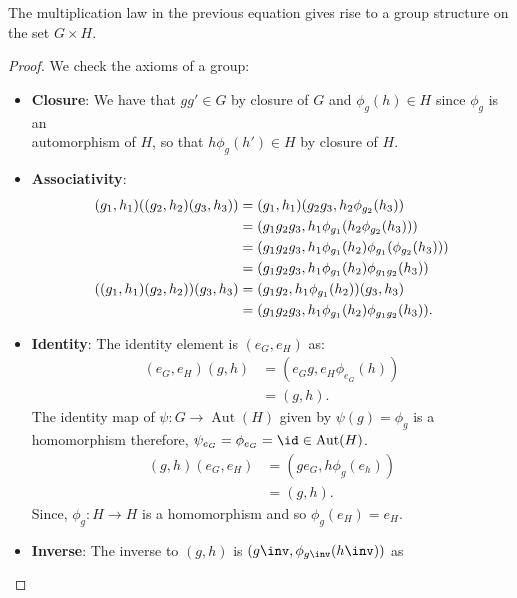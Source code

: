 \documentclass[12pt, a4paper]{article}
\DeclareMathOperator{\aut}{Aut}
\begin{document}
\begin{theorem}
    The multiplication law in the previous equation gives rise to a group structure on the set \(G \times H\).
\end{theorem}

\begin{proof}
    We check the axioms of a group:
    \begin{itemize}
        \item \textbf{Closure}: We have that \(gg' \in G\) by closure of \(G\) and \(\phi_g(h) \in H\) since \(\phi_g\) is an \\ automorphism of \(H\), so that \(h\phi_g(h') \in H\) by closure of \(H\).
        \item \textbf{Associativity}: 
        \[\begin{aligned}
            (g_1,h_1)((g_2,h_2)(g_3,h_3)) &= (g_1,h_1)(g_2g_3,h_2\phi_{g_2}(h_3)) \\
            &= (g_1g_2g_3, h_1\phi_{g_1}(h_2\phi_{g_2}(h_3))) \\
            &= (g_1g_2g_3, h_1\phi_{g_1}(h_2)\phi_{g_1}(\phi_{g_2}(h_3))) \\
            &= (g_1g_2g_3, h_1\phi_{g_1}(h_2)\phi_{g_1g_2}(h_3)) \\
            \vspace{5em}
            ((g_1,h_1)(g_2,h_2))(g_3,h_3) &= (g_1g_2,h_1\phi_{g_1}(h_2)) (g_3,h_3) \\
            &= (g_1g_2g_3 , h_1\phi_{g_1}(h_2)\phi_{g_1g_2}(h_3)).
        \end{aligned}\]
        \item \textbf{Identity}: The identity element is \((e_G, e_H)\) as:
        \[\begin{aligned}
            (e_G, e_H)(g,h) &= (e_G g, e_H \phi_{e_G}(h)) \\
                            &= (g,h).
        \end{aligned}\]
        The identity map of \(\psi : G \to \aut(H)\) given by \(\psi(g)=\phi_g\) is a homomorphism therefore, \(\psi_{e_G}=\phi_{e_G} = \id \in \aut(H)\).
        \[\begin{aligned}
            (g,h)(e_G, e_H) &= (ge_G, h\phi_g(e_h)) \\
                            &= (g,h).
        \end{aligned}\]
        Since, \(\phi_g : H \to H\) is a homomorphism and so \(\phi_g(e_H)=e_H\).
        \item \textbf{Inverse}: The inverse to \((g,h)\) is \((g\inv, \phi_{g\inv}(h\inv))\) as

\end{itemize}
\end{proof}
\end{document}
